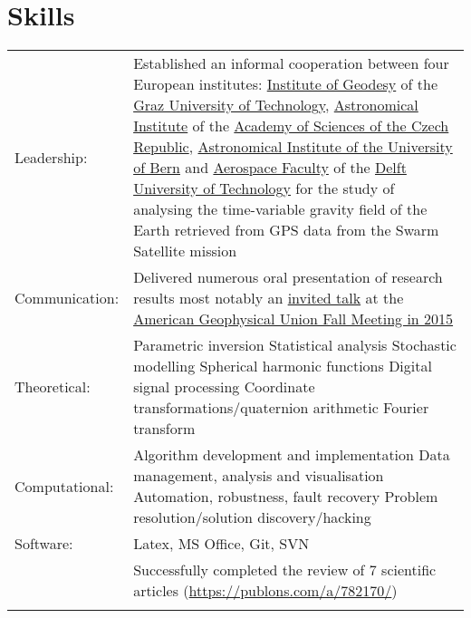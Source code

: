 \documentclass[a4paper]{article}
\newcommand{\procv}[2]{\iftoggle{professionalcv}{#1}{#2}}
\newlength{\listskipbig}
\newenvironment{cvsection}[2]{
  \vspace{0.15in}
  \section*{#1}
  \vspace{-0.2in}
  \begin{longtable}{lp{#2}}
}{
  \end{longtable}
}
\begin{document}

\begin{cvsection}{Skills}{11.2cm}
Leadership: & Established an informal cooperation between four European institutes:\newline
  \href{http://www.itsg.tugraz.at}{Institute of Geodesy} of the \href{http://www.tugraz.at}{Graz University of Technology},\newline
  \href{http://www.asu.cas.cz/en}{Astronomical Institute} of the \href{http://www.cas.cz/index.html}{Academy of Sciences of the Czech Republic},\newline
  \href{http://www.aiub.unibe.ch}{Astronomical Institute of the University of Bern} and\newline
  \href{http://www.lr.tudelft.nl}{Aerospace Faculty} of the \href{http://www.tudelft.nl}{Delft University of Technology}\newline
  for the study of analysing the time-variable gravity field of the Earth retrieved from GPS data from the Swarm Satellite mission\\[\listskipbig]

Communication:  & Delivered numerous oral presentation of research results\newline
                  most notably an \href{http://agu.confex.com/agu/fm15/meetingapp.cgi/Paper/71877}{invited talk} at the \href{http://fallmeeting.agu.org/2015/}{American Geophysical Union Fall Meeting in 2015}\\[\listskipbig]

Theoretical:   & Parametric inversion\newline
                 Statistical analysis\newline
                 Stochastic modelling\newline
                 Spherical harmonic functions\newline
                 Digital signal processing\newline
                 Coordinate transformations\slash quaternion arithmetic\newline
                 Fourier transform\\[\listskipbig]

Computational:  & Algorithm development and implementation\newline
                  Data management, analysis and visualisation\newline
                  Automation, robustness, fault recovery\newline
                  Problem resolution\slash solution discovery\slash hacking\\[\listskipbig]
Software: & Latex, MS Office, Git, SVN\\[\listskipbig]
\procv{}{
Articles review: & Successfully completed the review of 7 scientific articles (\href{https://publons.com/a/782170/}{https://publons.com/a/782170/})\\[\listskipbig]
}


\end{cvsection}
\end{document}
